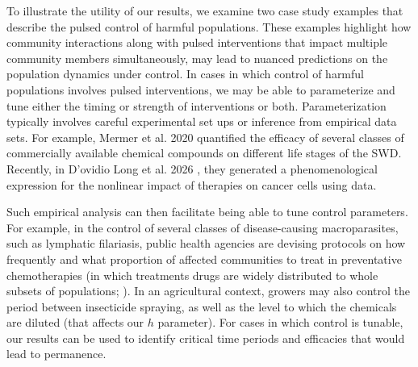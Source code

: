 \documentclass{article}
\theoremstyle{definition}
\begin{document}
To illustrate the utility of our results, we examine two case study examples that describe the pulsed control of harmful populations. These examples highlight how community interactions along with pulsed interventions that impact multiple community members simultaneously, may lead to nuanced predictions on the population dynamics under control.
In cases in which control of harmful populations involves pulsed interventions, we may be able to parameterize and tune either the timing or strength of interventions or both.  
Parameterization typically involves careful experimental set ups or inference from empirical data sets. For example, Mermer et al. 2020 \cite{mermer2021timing} quantified the efficacy of several classes of commercially available chemical compounds on different life stages of the SWD. Recently, in D'ovidio Long et al. 2026 \cite{d2026dynamical}, they generated a phenomenological expression for the nonlinear impact of therapies on cancer cells using data. 

Such empirical analysis can then facilitate being able to tune control parameters. For example, in the control of several classes of disease-causing macroparasites, such as lymphatic filariasis, public health agencies are devising protocols on how frequently and what proportion of affected communities to treat in preventative chemotherapies (in which treatments drugs are widely distributed to whole subsets of populations; \cite{world2025monitoring}).  In an agricultural context, growers may also control the period between insecticide spraying, as well as the level to which the chemicals are diluted (that affects our $h$ parameter).  For cases in which control is tunable, our results can be used to identify critical time periods and efficacies that would lead to permanence.
\end{document}
